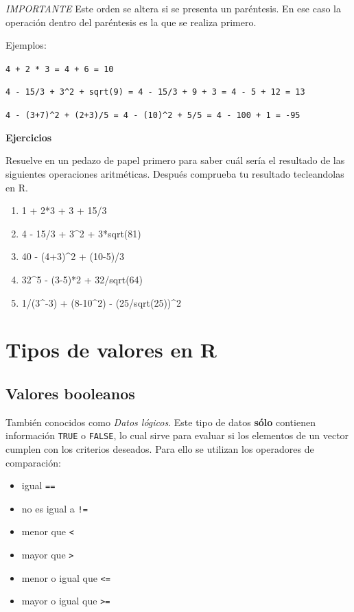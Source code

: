\documentclass[
]{book}
\providecommand{\tightlist}{%
  \setlength{\itemsep}{0pt}\setlength{\parskip}{0pt}}
\begin{document}
\emph{IMPORTANTE} Este orden se altera si se presenta un paréntesis. En ese caso la operación dentro del paréntesis es la que se realiza primero.

Ejemplos:

\texttt{4\ +\ 2\ *\ 3\ =\ 4\ +\ 6\ =\ 10}

\texttt{4\ -\ 15/3\ +\ 3\^{}2\ +\ sqrt(9)\ =\ 4\ -\ 15/3\ +\ 9\ +\ 3\ =\ 4\ -\ 5\ +\ 12\ =\ 13}

\texttt{4\ -\ (3+7)\^{}2\ +\ (2+3)/5\ =\ 4\ -\ (10)\^{}2\ +\ 5/5\ =\ 4\ -\ 100\ +\ 1\ =\ -95}

\textbf{Ejercicios}

Resuelve en un pedazo de papel primero para saber cuál sería el resultado de las siguientes operaciones aritméticas. Después comprueba tu resultado tecleandolas en R.

\begin{enumerate}
\def\labelenumi{\arabic{enumi}.}
\tightlist
\item
  1 + 2*3 + 3 + 15/3
\item
  4 - 15/3 + 3\^{}2 + 3*sqrt(81)
\item
  40 - (4+3)\^{}2 + (10-5)/3
\item
  32\^{}5 - (3-5)*2 + 32/sqrt(64)
\item
  1/(3\^{}-3) + (8-10\^{}2) - (25/sqrt(25))\^{}2
\end{enumerate}

\section{Tipos de valores en R}\label{tipos-de-valores-en-r}

\subsection{Valores booleanos}\label{valores-booleanos}

También conocidos como \emph{Datos lógicos}.
Este tipo de datos \textbf{sólo} contienen información \texttt{TRUE} o \texttt{FALSE}, lo cual sirve para evaluar si los elementos de un vector cumplen con los criterios deseados. Para ello se utilizan los operadores de comparación:

\begin{itemize}
\tightlist
\item
  igual \texttt{==}
\item
  no es igual a \texttt{!=}
\item
  menor que \texttt{\textless{}}
\item
  mayor que \texttt{\textgreater{}}
\item
  menor o igual que \texttt{\textless{}=}
\item
  mayor o igual que \texttt{\textgreater{}=}
\end{itemize}
\end{document}
